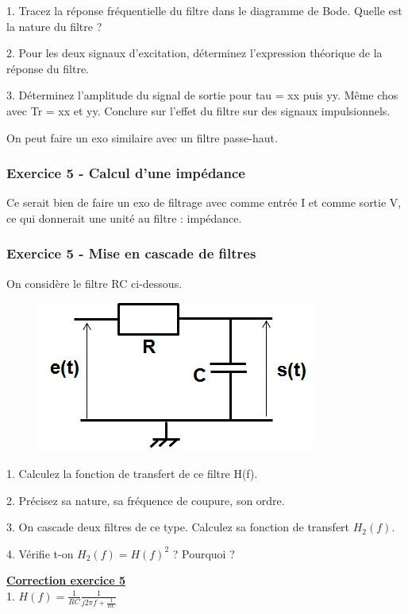 \documentclass[11pt]{report}
\begin{document}
	1. Tracez la réponse fréquentielle du filtre dans le diagramme de Bode. Quelle est la nature du filtre ?
	
	2. Pour les deux signaux d'excitation, déterminez l'expression théorique de la réponse du filtre.
	
	3. Déterminez l'amplitude du signal de sortie pour tau = xx puis yy. Même chos avec Tr = xx et yy. Conclure sur l'effet du filtre sur des signaux impulsionnels.
	
	On peut faire un exo similaire avec un filtre passe-haut.
	
	
	\subsubsection{Exercice 5 - Calcul d'une impédance}
	
	Ce serait bien de faire un exo de filtrage avec comme entrée I et comme sortie V, ce qui donnerait une unité au filtre : impédance.
	
	
	\subsubsection{Exercice 5 - Mise en cascade de filtres}
	On considère le filtre RC ci-dessous.
	
	\begin{figure}[h!]
		\centering
		\includegraphics[scale=0.5]{images/Filtre_RC_passe_bas.jpg} 
	\end{figure}

	1. Calculez la fonction de transfert de ce filtre H(f).
	
	2. Précisez sa nature, sa fréquence de coupure, son ordre.
	
	3. On cascade deux filtres de ce type. Calculez sa fonction de transfert $H_{2}(f)$.
	
	4. Vérifie t-on $H_{2}(f)=H(f)^{2}$ ? Pourquoi ?
	
	\vspace{1\baselineskip}
	
	\textbf{\underline{Correction exercice 5}}\\
	1. $H(f)=\frac{1}{RC}\frac{1}{j2\pi f+\frac{1}{RC}}$
	
\end{document}
